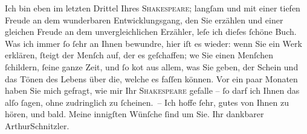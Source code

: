 \pstart
           Ich \introOben{}bin\introOben{} eben im letzten Drittel Ihres \textsc{Shakespeare}; langſam und mit einer tiefen Freude an dem wunderbaren {\pb}Entwicklungsgang, den Sie erzählen und einer
               gleichen Freude an dem unvergleichlichen Erzähler, leſe ich dieſes ſchöne Buch. Was
               ich immer ſo ſehr an Ihnen bewundre, hier iſt es wieder: wenn Sie ein Werk erklären,
               ſteigt der Menſch auf, der es geſchaffen; we{\geminationn} Sie einen
               Menſchen ſchildern, ſeine ganze Zeit, und {\pb}ſo ko{\geminationm}t aus allem, was
               Sie geben, der Schein und das Tönen des Lebens über die, welche es faſſen können. Vor
               ein paar Monaten haben Sie mich gefragt, wie mir Ihr \textsc{Shakespeare} gefalle – ſo darf ich Ihnen das alſo ſagen, ohne zudringlich zu ſcheinen. –\pend
           \pstart Ich hoffe ſehr, gutes von Ihnen zu hören, und bald. Meine innigſten Wünſche ſind
               um Sie. Ihr dankbarer \spacefill\mbox{ArthurSchnitzler.}\pend{}\endnumbering{}  
      